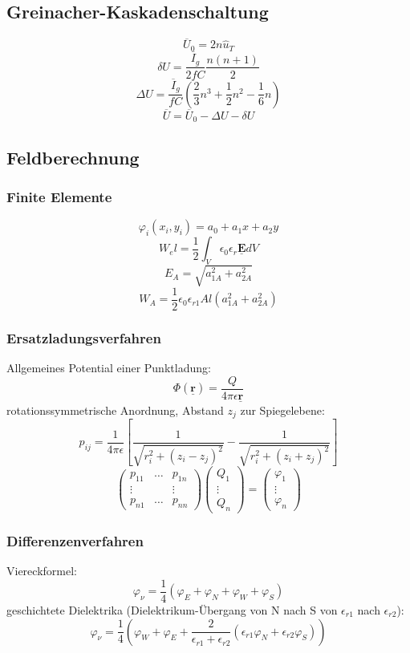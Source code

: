 \documentclass[9pt,a4paper]{scrartcl}
\renewcommand{\vec}[1]{\ensuremath{\underline{\boldsymbol {#1}}}}
\begin{document}
\begin{multicols}{3}
		\subsection{Greinacher-Kaskadenschaltung}
		\[\overline U_0 = 2 n \hat u_T\]
		\[\delta U = \frac{\overline I_g}{2 f C} \frac{n (n + 1)}{2}\]
		\[\Delta U = \frac{\overline I_g}{f C} \left( \frac{2}{3} n^3 + \frac{1}{2} n^2 - \frac{1}{6} n \right) \]
		\[\overline U = \overline U_0 - \Delta U - \delta U\]
		
		\subsection{Feldberechnung}
		\subsubsection{Finite Elemente}
		\[\varphi_i(x_i, y_i) = a_0 + a_1 x + a_2 y\]
		\[W_el = \frac{1}{2} \int_V \epsilon_0 \epsilon_r \vec E dV\]
		\[E_A = \sqrt{a_{1A}^2 + a_{2A}^2}\]
		\[W_A = \frac{1}{2} \epsilon_0 \epsilon_{r1} A l (a_{1A}^2 + a_{2A}^2)\]
		
		\subsubsection{Ersatzladungsverfahren}
		Allgemeines Potential einer Punktladung:
		\[\Phi(\vec r) = \frac{Q}{4 \pi \epsilon \vec r}\]
		rotationssymmetrische Anordnung, Abstand $z_j$ zur Spiegelebene:
		\[p_{ij} = \frac{1}{4 \pi \epsilon} \left[ \frac{1}{\sqrt{r_i^2 + (z_i - z_j)^2}} - \frac{1}{\sqrt{r_i^2 + (z_i + z_j)^2}} \right]\]
		\[\begin{pmatrix} p_{11} & \hdots & p_{1n} \\ \vdots & & \vdots \\ p_{n1} & \hdots & p_{nn} \end{pmatrix} \begin{pmatrix} Q_1 \\ \vdots \\ Q_n \end{pmatrix} = \begin{pmatrix} \varphi_1 \\ \vdots \\ \varphi_n \end{pmatrix}\]
		
		\subsubsection{Differenzenverfahren}
		Viereckformel:
		\[\varphi_\nu = \frac{1}{4}(\varphi_E + \varphi_N + \varphi_W + \varphi_S)\]
		geschichtete Dielektrika (Dielektrikum-Übergang von N nach S von $\epsilon_{r1}$ nach $\epsilon_{r2}$):
		\[\varphi_\nu = \frac{1}{4}(\varphi_W + \varphi_E + \frac{2}{\epsilon_{r1} + \epsilon_{r2}} (\epsilon_{r1} \varphi_N + \epsilon_{r2} \varphi_S))\]
		

\end{multicols}
\end{document}
